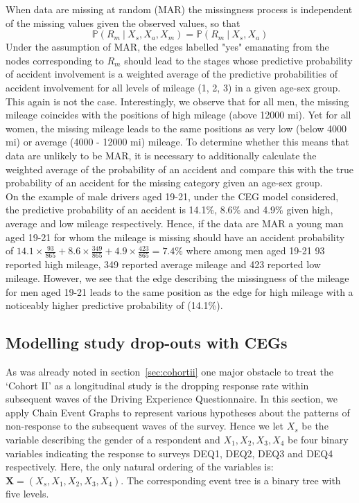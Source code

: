 \documentclass[runningheads]{llncs}
\begin{document}
When data are missing at random (MAR) the missingness process is independent of the missing values given the observed values, so that 
\[\mathbb{P}(R_m \ | \ X_s, X_a, X_m) =  \mathbb{P}(R_m \ | \ X_s, X_a)\]
Under the assumption of MAR, the edges labelled "yes" emanating from the nodes corresponding to $R_m$ should lead to the stages whose predictive probability of accident involvement is a weighted average of the predictive probabilities of accident involvement for all levels of mileage (1, 2, 3) in a given age-sex group. 
This again is not the case. Interestingly, we observe that for all men, the missing mileage coincides with the positions of high mileage (above 12000 mi). Yet for all women, the missing mileage leads to the same positions as very low (below 4000 mi) or average (4000 - 12000 mi) mileage. To determine whether this means that data are unlikely to be MAR, it is necessary to additionally calculate the weighted average of the probability of an accident and compare this with the true probability of an accident for the missing category given an age-sex group. \\
On the example of male drivers aged 19-21, under the CEG model considered, the predictive probability of an accident is 14.1\%, 8.6\% and 4.9\% given high, average and low mileage respectively. Hence, if the data are MAR a young man aged 19-21 for whom the mileage is missing should have an accident probability of $14.1 \times \frac{93}{865} + 8.6 \times \frac{349}{865} + 4.9 \times \frac{423}{865} = 7.4\%$ where among men aged 19-21 93 reported high mileage, 349 reported average mileage and 423 reported low mileage. However, we see that the edge describing the missingness of the mileage for men aged 19-21 leads to the same position as the edge for high mileage with a noticeably higher predictive probability of (14.1\%). 

\subsection{Modelling study drop-outs with CEGs}\label{subsec:dropouts}
As was already noted in section~\ref{sec:cohortii} one major obstacle to treat the `Cohort II' as a longitudinal study is the dropping response rate within subsequent waves of the Driving Experience Questionnaire.
In this section, we apply Chain Event Graphs to represent various hypotheses about the patterns of non-response to the subsequent waves of the survey. Hence we let $X_s$ be the variable describing the gender of a respondent and $X_1, X_2, X_3, X_4$ be four binary variables indicating the response to surveys DEQ1, DEQ2, DEQ3 and DEQ4 respectively. Here, the only natural ordering of the variables is: $\boldsymbol{X} = (X_s, X_1, X_2, X_3, X_4)$. The corresponding event tree is a binary tree with five levels.
\end{document}
